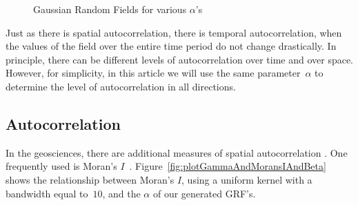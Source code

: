 \documentclass[ijgi,article,submit,moreauthors,pdftex,10pt,a4paper]{Definitions/mdpi}
\begin{document}
\begin{figure}[H]
\hspace{8mm}
\caption{Gaussian Random Fields for various $\alpha$'s}
\label{fig:GaussianRandomField}
\end{figure}

Just as there is spatial autocorrelation, there is temporal autocorrelation, when the values of the field over the entire time period do not change drastically. In principle, there can be different levels of autocorrelation over time and over space. However, for simplicity, in this article we will use the same parameter~$\alpha$ to determine the level of autocorrelation in all directions.

\subsection{Autocorrelation}
\label{sec:Materials and Methods/Autocorrelation}

In the geosciences, there are additional measures of spatial autocorrelation \cite{Eshel2011, Storch1999}. One frequently used is Moran's $I$~\cite{Moran1950, Hubert1981, PySAL}. Figure~\ref{fig:plotGammaAndMoransIAndBeta} shows the relationship between Moran's $I$, using a uniform kernel with a bandwidth equal to~$10$, and the $\alpha$ of our generated GRF's.
\end{document}
